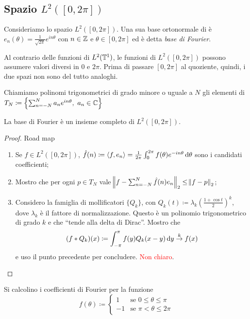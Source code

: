 \subsection{Spazio $ L^2([0, 2\pi]) $}
Consideriamo lo spazio $ L^2([0, 2\pi]) $.
Una sua base ortonormale di è $ e_n(\theta) = \frac{1}{\sqrt{2\pi}}e^{i n \theta} $ con $ n \in \mathbb{Z} $ e $ \theta \in [0, 2\pi] $ ed è detta \emph{base di Fourier}.

\begin{oss}
    Al contrario delle funzioni di $ L^2(\mathbb{T}^1) $, le funzioni di $ L^2([0, 2\pi]) $ possono assumere valori diversi in $ 0 $ e $ 2\pi $. Prima di passare $ [0,2\pi] $ al quoziente, quindi, i due spazi non sono del tutto analoghi.
\end{oss}

\begin{definition}
    Chiamiamo polinomi trigonometrici di grado minore o uguale a $ N $ gli elementi di
    $ T_N \coloneqq \left\{\sum_{n = -N}^{N} a_n e^{i n \theta}, \ a_n \in \mathbb{C}\right\} $
\end{definition}

\begin{thm}
    La base di Fourier è un insieme completo di $ L^2([0,2\pi]) $.
\end{thm}
\begin{proof}
    Road map
    \begin{enumerate}
        \item Se $ f \in L^2([0, 2\pi]) $, $ \hat{f}(n) \coloneqq {\langle f, e_n \rangle} = \frac{1}{2\pi} \int_{0}^{2\pi} f(\theta) e^{-i n\theta} \dif{\theta} $ sono i candidati coefficienti;
        \item Mostro che per ogni $ p \in T_N $ vale $ \norm{f - \sum_{n = -N}^{N} \hat{f}(n) e_n}_2 \leq \norm{f - p}_2 $;
        \item Considero la famiglia di mollificatori $ \{Q_k\} $, con $ Q_k(t) \coloneqq \lambda_k (\frac{1 + \cos{t}}{2})^k $, dove $ \lambda_k $ è il fattore di normalizzazione. Questo è un polinomio trigonometrico di grado $ k $ e che ``tende alla delta di Dirac''. Mostro che
        \[
            (f * Q_k)(x) \coloneqq \int_{-\pi}^{\pi} f(y) Q_k(x - y) \dif{y} \overset{k}{\to} f(x)
        \]
        e uso il punto precedente per concludere. \textcolor{red}{Non chiaro}.
    \end{enumerate}
\end{proof}

\begin{exercise}
    Si calcolino i coefficienti di Fourier per la funzione
    \[
        f(\theta) \coloneqq
        \begin{cases}
            1  & \text{se } 0 \leq \theta \leq \pi \\
            -1 & \text{se } \pi < \theta \leq 2\pi
        \end{cases}
    \]
\end{exercise}
